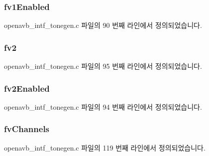 \subsubsection[{\texorpdfstring{fv1\+Enabled}{fv1Enabled}}]{ fv1\+Enabled}\hypertarget{structpvt__data__t_aeb60b20626751ef7c9c0046ed026a681}{}\label{structpvt__data__t_aeb60b20626751ef7c9c0046ed026a681}


openavb\+\_\+intf\+\_\+tonegen.\+c 파일의 90 번째 라인에서 정의되었습니다.

\subsubsection[{\texorpdfstring{fv2}{fv2}}]{ fv2}\hypertarget{structpvt__data__t_a7cc03784ca8e5c2407ffcf0b9ee62236}{}\label{structpvt__data__t_a7cc03784ca8e5c2407ffcf0b9ee62236}


openavb\+\_\+intf\+\_\+tonegen.\+c 파일의 95 번째 라인에서 정의되었습니다.

\subsubsection[{\texorpdfstring{fv2\+Enabled}{fv2Enabled}}]{ fv2\+Enabled}\hypertarget{structpvt__data__t_a27b884756b6fc446de19b96a3fab08cd}{}\label{structpvt__data__t_a27b884756b6fc446de19b96a3fab08cd}


openavb\+\_\+intf\+\_\+tonegen.\+c 파일의 94 번째 라인에서 정의되었습니다.

\subsubsection[{\texorpdfstring{fv\+Channels}{fvChannels}}]{ fv\+Channels}\hypertarget{structpvt__data__t_a726c75c30e70594b870fea648d2b5a89}{}\label{structpvt__data__t_a726c75c30e70594b870fea648d2b5a89}


openavb\+\_\+intf\+\_\+tonegen.\+c 파일의 119 번째 라인에서 정의되었습니다.

